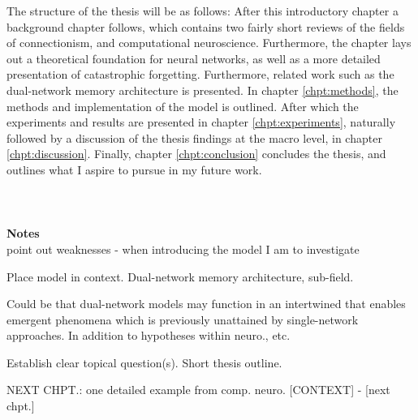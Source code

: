 The structure of the thesis will be as follows: After this introductory chapter a background chapter follows, which contains two fairly short reviews of the fields of connectionism, and computational neuroscience. Furthermore, the chapter lays out a theoretical foundation for neural networks, as well as a more detailed presentation of catastrophic forgetting. Furthermore, related work such as the dual-network memory architecture is presented. In chapter \ref{chpt:methods}, the methods and implementation of the model is outlined. After which the experiments and results are presented in chapter \ref{chpt:experiments}, naturally followed by a discussion of the thesis findings at the macro level, in chapter \ref{chpt:discussion}. Finally, chapter \ref{chpt:conclusion} concludes the thesis, and outlines what I aspire to pursue in my future work.
\\\\\\\\


\textbf{Notes}
\\

point out weaknesses - when introducing the model I am to investigate

Place model in context.
Dual-network memory architecture, sub-field.

Could be that dual-network models may function in an intertwined that enables emergent phenomena which is previously unattained by single-network approaches. In addition to hypotheses within neuro., etc.

Establish clear topical question(s).
Short thesis outline.


NEXT CHPT.:
one detailed example from comp. neuro. [CONTEXT] - [next chpt.]

\cleardoublepage